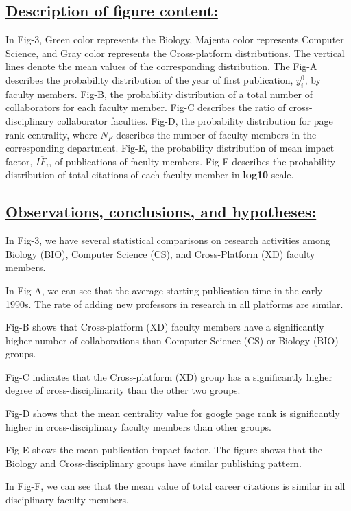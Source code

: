 \documentclass{article}\usepackage[]{graphicx}\usepackage[]{color}
\begin{document}
\subsection*{\underline{Description of figure content:}}
\par{In Fig-3, Green color represents the Biology, Majenta color represents Computer Science, and Gray color represents the Cross-platform distributions. The vertical lines denote the mean values of the corresponding distribution. The Fig-A describes the probability distribution of the year of first publication, $y_i^0$, by faculty members. Fig-B, the probability distribution of a total number of collaborators for each faculty member. Fig-C describes the ratio of cross-disciplinary collaborator faculties. Fig-D, the probability distribution for page rank centrality, where $N_F$ describes the number of faculty members in the corresponding department. Fig-E, the probability distribution of mean impact factor, $\overline{IF_i}$, of publications of faculty members. Fig-F describes the probability distribution of total citations of each faculty member in \textbf{log10} scale.}
\subsection*{\underline{Observations, conclusions, and hypotheses:}}
\begin{description}
  \item In Fig-3, we have several statistical comparisons on research activities among Biology (BIO), Computer Science (CS), and Cross-Platform (XD) faculty members. 
  \item[$\bullet$] In Fig-A, we can see that the average starting publication time in the early 1990s. The rate of adding new professors in research in all platforms are similar. 
  \item[$\bullet$]Fig-B shows that Cross-platform (XD) faculty members have a significantly higher number of collaborations than Computer Science (CS) or Biology (BIO) groups. 
  \item[$\bullet$]Fig-C indicates that the Cross-platform (XD) group has a significantly higher degree of cross-disciplinarity than the other two groups.
  \item[$\bullet$]Fig-D shows that the mean centrality value for google page rank is significantly higher in cross-disciplinary faculty members than other groups. 
  \item[$\bullet$]Fig-E shows the mean publication impact factor. The figure shows that the Biology and Cross-disciplinary groups have similar publishing pattern.
  \item[$\bullet$]In Fig-F, we can see that the mean value of total career citations is similar in all disciplinary faculty members.
\end{description}
\end{document}
